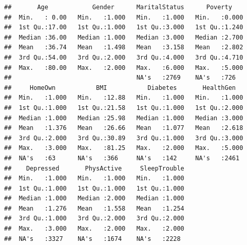 \documentclass[]{article}
\newenvironment{Shaded}{\begin{snugshade}}{\end{snugshade}}
\newcommand{\KeywordTok}[1]{\textcolor[rgb]{0.13,0.29,0.53}{\textbf{{#1}}}}
\newcommand{\StringTok}[1]{\textcolor[rgb]{0.31,0.60,0.02}{{#1}}}
\newcommand{\CommentTok}[1]{\textcolor[rgb]{0.56,0.35,0.01}{\textit{{#1}}}}
\newcommand{\NormalTok}[1]{{#1}}
\begin{document}
\begin{Shaded}
\end{Shaded}

\begin{verbatim}
##       Age            Gender      MaritalStatus      Poverty     
##  Min.   : 0.00   Min.   :1.000   Min.   :1.000   Min.   :0.000  
##  1st Qu.:17.00   1st Qu.:1.000   1st Qu.:3.000   1st Qu.:1.240  
##  Median :36.00   Median :1.000   Median :3.000   Median :2.700  
##  Mean   :36.74   Mean   :1.498   Mean   :3.158   Mean   :2.802  
##  3rd Qu.:54.00   3rd Qu.:2.000   3rd Qu.:4.000   3rd Qu.:4.710  
##  Max.   :80.00   Max.   :2.000   Max.   :6.000   Max.   :5.000  
##                                  NA's   :2769    NA's   :726    
##     HomeOwn           BMI           Diabetes       HealthGen    
##  Min.   :1.000   Min.   :12.88   Min.   :1.000   Min.   :1.000  
##  1st Qu.:1.000   1st Qu.:21.58   1st Qu.:1.000   1st Qu.:2.000  
##  Median :1.000   Median :25.98   Median :1.000   Median :3.000  
##  Mean   :1.376   Mean   :26.66   Mean   :1.077   Mean   :2.618  
##  3rd Qu.:2.000   3rd Qu.:30.89   3rd Qu.:1.000   3rd Qu.:3.000  
##  Max.   :3.000   Max.   :81.25   Max.   :2.000   Max.   :5.000  
##  NA's   :63      NA's   :366     NA's   :142     NA's   :2461   
##    Depressed       PhysActive     SleepTrouble  
##  Min.   :1.000   Min.   :1.000   Min.   :1.000  
##  1st Qu.:1.000   1st Qu.:1.000   1st Qu.:1.000  
##  Median :1.000   Median :2.000   Median :1.000  
##  Mean   :1.276   Mean   :1.558   Mean   :1.254  
##  3rd Qu.:1.000   3rd Qu.:2.000   3rd Qu.:2.000  
##  Max.   :3.000   Max.   :2.000   Max.   :2.000  
##  NA's   :3327    NA's   :1674    NA's   :2228
\end{verbatim}
\end{document}
